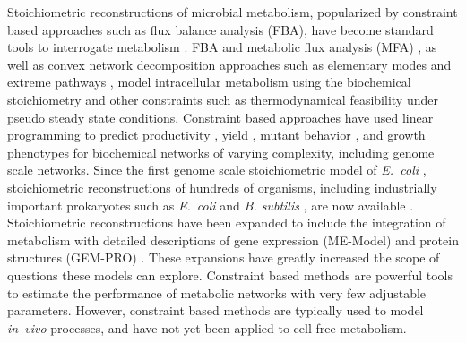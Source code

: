 \documentclass[journal=asbcd6,manuscript=article]{achemso}
\begin{document}
Stoichiometric reconstructions of microbial metabolism, popularized by constraint based approaches such as flux balance analysis (FBA), have become standard tools to interrogate metabolism \cite{2012_lewis_palsson_NatRevMicrobio}.
FBA and metabolic flux analysis (MFA) \cite{WIECHERT2001195}, as well as convex network decomposition approaches such as elementary modes \cite{Schuster:2000aa} and extreme pathways \cite{Schilling:2000aa}, model intracellular metabolism using the biochemical stoichiometry and other constraints such as thermodynamical feasibility \cite{Henry:2007,Hamilton:2013} under pseudo steady state conditions.
Constraint based approaches have used linear programming \cite{Covert:2004aa} to predict productivity \cite{Varma01101994, BTPR:BTPR2132}, yield \cite{Varma01101994}, mutant behavior \cite{Edwards2000}, and growth phenotypes \cite{Brien693} for biochemical networks of varying complexity, including genome scale networks.
Since the first genome scale stoichiometric model of \textit{E.~coli} \cite{2000_edwards_palsson_PNAS}, stoichiometric reconstructions of hundreds of organisms, including industrially important prokaryotes such as \textit{E.~coli} \cite{Feist:2007aa} and \textit{B. subtilis} \cite{Oh:2007aa}, are now available \cite{2009_feist_palsson_NatRevMicrobio}.
Stoichiometric reconstructions have been expanded to include the integration of metabolism with detailed descriptions of gene expression (ME-Model) \cite{Allen:2003aa, Brien693} and protein structures (GEM-PRO) \cite{Zhang1544,Chang1220}.
These expansions have greatly increased the scope of questions these models can explore.
Constraint based methods are powerful tools to estimate the performance of metabolic networks with very few adjustable parameters.
However, constraint based methods are typically used to model \textit{in~vivo} processes, and have not yet been applied to cell-free metabolism.
\end{document}
